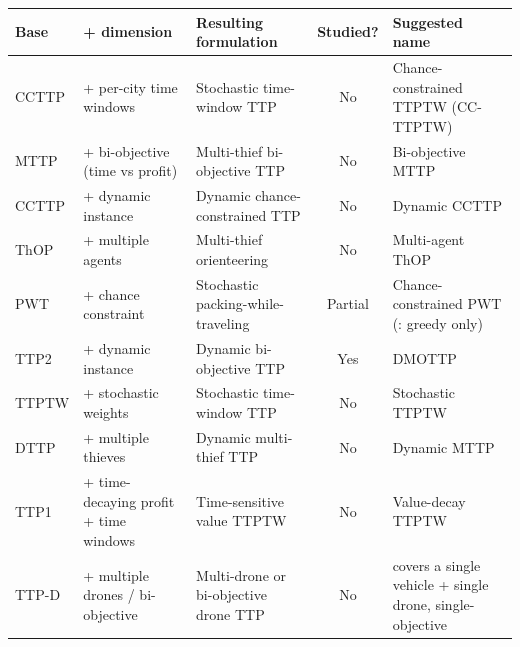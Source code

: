 
\begin{center}
\footnotesize
{}
\label{tab:unexplored}
\setlength{\tabcolsep}{3pt}
\begin{tabular}{@{}llp{5cm}cp{7.5cm}@{}}
\toprule
\textbf{Base} & \textbf{+ dimension} & \textbf{Resulting formulation} & \textbf{Studied?} & \textbf{Suggested name} \\
\midrule
CCTTP & + per-city time windows & Stochastic time-window TTP & No & Chance-constrained TTPTW (CC-TTPTW) \\
MTTP & + bi-objective (time vs profit) & Multi-thief bi-objective TTP & No & Bi-objective MTTP \\
CCTTP & + dynamic instance & Dynamic chance-constrained TTP & No & Dynamic CCTTP \\
ThOP & + multiple agents & Multi-thief orienteering & No & Multi-agent ThOP \\
PWT & + chance constraint & Stochastic packing-while-traveling & Partial & Chance-constrained PWT (\cite{don2026greedy}: greedy only) \\
TTP2 & + dynamic instance & Dynamic bi-objective TTP & Yes & DMOTTP \citep{herring2020dynamic} \\
TTPTW & + stochastic weights & Stochastic time-window TTP & No & Stochastic TTPTW \\
DTTP & + multiple thieves & Dynamic multi-thief TTP & No & Dynamic MTTP \\
TTP1 & + time-decaying profit + time windows & Time-sensitive value TTPTW & No & Value-decay TTPTW \\
TTP-D & + multiple drones / bi-objective & Multi-drone or bi-objective drone TTP & No & \citep{murjani2026drive} covers a single vehicle + single drone, single-objective \\
\bottomrule
\end{tabular}
\end{center}
